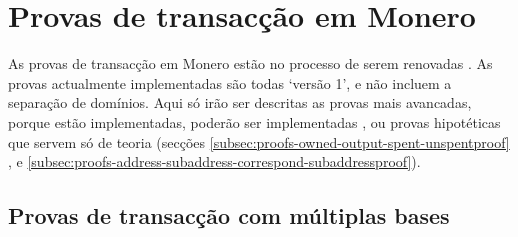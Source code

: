 \section{Provas de transacção em Monero}
\label{sec:proofs-monero-proofs}

As provas de transacção em Monero estão no processo de serem renovadas \cite{sarang-txproofs-updates-issue}. As provas actualmente implementadas são todas `versão 1', e não incluem a separação de domínios. Aqui só irão ser descritas as provas mais avancadas, porque estão implementadas, poderão ser implementadas \cite{sarang-txproofs-v2-update-pr}, ou provas hipotéticas que servem só de teoria (secções \ref{subsec:proofs-owned-output-spent-unspentproof} \cite{unspent-proof-issue-68}, e \ref{subsec:proofs-address-subaddress-correspond-subaddressproof}).



\subsection{Provas de transacção com múltiplas bases}
\label{subsec:proofs-multi-base-monero}

